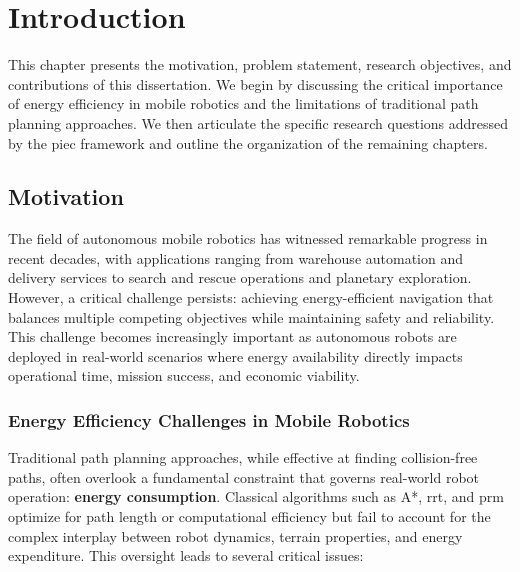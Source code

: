 \chapter{Introduction}
\label{ch:introduction}

This chapter presents the motivation, problem statement, research objectives, and contributions of this dissertation. We begin by discussing the critical importance of energy efficiency in mobile robotics and the limitations of traditional path planning approaches. We then articulate the specific research questions addressed by the \acrfull{piec} framework and outline the organization of the remaining chapters.

\section{Motivation}
\label{sec:motivation}

The field of autonomous mobile robotics has witnessed remarkable progress in recent decades, with applications ranging from warehouse automation and delivery services to search and rescue operations and planetary exploration. However, a critical challenge persists: achieving energy-efficient navigation that balances multiple competing objectives while maintaining safety and reliability. This challenge becomes increasingly important as autonomous robots are deployed in real-world scenarios where energy availability directly impacts operational time, mission success, and economic viability.

\subsection{Energy Efficiency Challenges in Mobile Robotics}

Traditional path planning approaches, while effective at finding collision-free paths, often overlook a fundamental constraint that governs real-world robot operation: \textbf{energy consumption}. Classical algorithms such as A*, \acrfull{rrt}, and \acrfull{prm} optimize for path length or computational efficiency but fail to account for the complex interplay between robot dynamics, terrain properties, and energy expenditure. This oversight leads to several critical issues:

